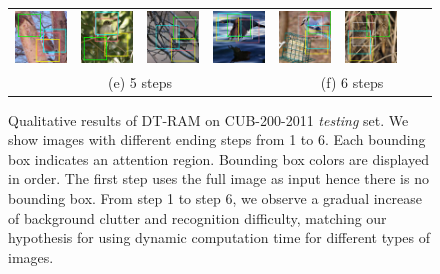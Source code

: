 \documentclass[10pt,twocolumn,letterpaper]{article}
\begin{document}
\begin{figure}[t]
\begin{tabular}{c c c c c c c c}
    \includegraphics[height=0.11\linewidth]{figs/exp/img/5/621.jpg} &
    \includegraphics[height=0.11\linewidth]{figs/exp/img/5/4183.jpg} & \hspace{10pt}
    \includegraphics[height=0.11\linewidth]{figs/exp/img/6/1912.jpg} &
    \includegraphics[height=0.11\linewidth]{figs/exp/img/6/2315.jpg} &
    \includegraphics[height=0.11\linewidth]{figs/exp/img/6/2828.jpg} &
    \includegraphics[height=0.11\linewidth]{figs/exp/img/6/3352.jpg} \\
    \multicolumn{4}{c}{(e) 5 steps}  & \multicolumn{4}{c}{(f) 6 steps} \\
  \end{tabular}
  \caption{Qualitative results of DT-RAM on CUB-200-2011 {\it testing} set. We show images with different ending steps from 1 to 6. Each bounding box indicates an attention region. Bounding box colors are displayed in order. The first step uses the full image as input hence there is no bounding box. From step 1 to step 6, we observe a gradual increase of background clutter and recognition difficulty, matching our hypothesis for using dynamic computation time for different types of images.}
  \label{fig:visualization}
\end{figure}
\end{document}
